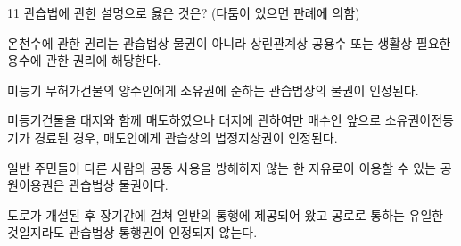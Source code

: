 \begin{question}{11}
관습법에 관한 설명으로 옳은 것은? (다툼이 있으면 판례에 의함)
\begin{choices}
  \item 온천수에 관한 권리는 관습법상 물권이 아니라 상린관계상 공용수 또는 생활상 필요한 용수에 관한 권리에 해당한다.
  \item 미등기 무허가건물의 양수인에게 소유권에 준하는 관습법상의 물권이 인정된다.
  \item 미등기건물을 대지와 함께 매도하였으나 대지에 관하여만 매수인 앞으로 소유권이전등기가 경료된 경우, 매도인에게 관습상의 법정지상권이 인정된다.
  \item 일반 주민들이 다른 사람의 공동 사용을 방해하지 않는 한 자유로이 이용할 수 있는 공원이용권은 관습법상 물권이다.
  \item 도로가 개설된 후 장기간에 걸쳐 일반의 통행에 제공되어 왔고 공로로 통하는 유일한 것일지라도 관습법상 통행권이 인정되지 않는다.
\end{choices}
\end{question}
